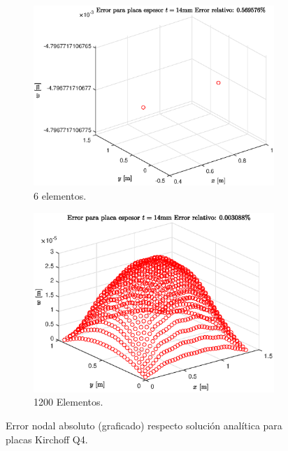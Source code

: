 \documentclass[onecolumn,10pt,titlepage]{article}
\begin{document}
 \begin{figure}[htb!]
 \centering
 \begin{subfigure}{.33\textwidth}
   \centering
   \includegraphics[width=\linewidth]{fig/6elemKircht100.eps}
   \caption{6 elementos.}
   \label{fig:Kirch6elemError}
 \end{subfigure}%
 \begin{subfigure}{.33\textwidth}
   \centering
   \includegraphics[width=\linewidth]{fig/t100KirchError.eps}
   \caption{1200 Elementos.}
   \label{fig:Kircherrort1200}
 \end{subfigure}
 \caption{Error nodal absoluto (graficado) respecto solución analítica para placas Kirchoff Q4.}
 \label{fig:Minderror}
 \end{figure}
\end{document}
